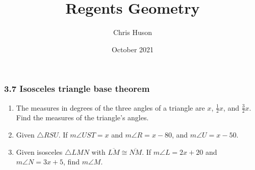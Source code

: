 \documentclass[12pt, twoside]{article}
\title{Regents Geometry}
\author{Chris Huson}
\date{October 2021}
\begin{document}
\subsubsection*{3.7 Isosceles triangle base theorem}
\begin{enumerate}
  \item The measures in degrees of the three angles of a triangle are $x$, $\frac{1}{2}x$, and $\frac{3}{2}x$. Find the measures of the triangle's angles. \vspace{4cm}

  \item Given $\triangle RSU$. If $m\angle UST=x$ and $m\angle R=x-80$, and $m\angle U=x-50$.
  \begin{flushright}
  \end{flushright} \vspace{2cm}
  

\item Given isosceles $\triangle LMN$ with $\overline{LM} \cong \overline{NM}$. If $m\angle L=2x+20$ and $m\angle N=3x+5$, find $m\angle M$.
\begin{flushright}
\end{flushright} \vspace{2cm}



\end{enumerate}
\end{document}
